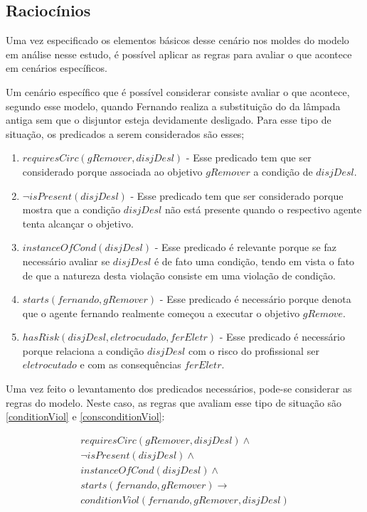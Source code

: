 \subsection{Raciocínios}

Uma vez especificado os elementos básicos desse cenário nos moldes do modelo em análise nesse estudo, é possível aplicar as regras para avaliar o que acontece em cenários específicos. 

Um cenário específico que é possível considerar consiste avaliar o que acontece, segundo esse modelo, quando Fernando realiza a substituição do da lâmpada antiga sem que o disjuntor esteja devidamente desligado. Para esse tipo de situação, os predicados a serem considerados são esses;

\begin{enumerate}
	\item $requiresCirc(gRemover,disjDesl)$ - Esse predicado tem que ser considerado porque associada ao objetivo $gRemover$ a condição de $disjDesl$.
	\item $\neg isPresent(disjDesl)$ - Esse predicado tem que ser considerado porque mostra que a condição $disjDesl$ não está presente quando o respectivo agente tenta alcançar o objetivo.
	\item $instanceOfCond(disjDesl)$ - Esse predicado é relevante porque se faz necessário avaliar se $disjDesl$ é de fato uma condição, tendo em vista o fato de que a natureza desta violação consiste em uma violação de condição.
	\item $starts(fernando,gRemover)$ - Esse predicado é necessário porque denota que o agente fernando realmente começou a executar o objetivo $gRemove$.
	\item $hasRisk(disjDesl, eletrocudado, ferEletr)$ - Esse predicado é necessário porque relaciona a condição $disjDesl$ com o risco do profissional ser $eletrocutado$ e com as consequências $ferEletr$.
\end{enumerate}

Uma vez feito o levantamento dos predicados necessários, pode-se considerar as regras do modelo. Neste caso, as regras que avaliam esse tipo de situação são \ref{conditionViol} e \ref{consconditionViol}:

\begin{eqnarray}\label{applicationCodViolIntrodCase}\nonumber
	requiresCirc(gRemover,disjDesl) \wedge \\ \nonumber   
	\neg isPresent(disjDesl) \wedge  \\ \nonumber   
	instanceOfCond(disjDesl) \wedge \\ \nonumber   
	starts(fernando,gRemover)  \to \\ \nonumber   
	conditionViol(fernando,gRemover,disjDesl) \nonumber \\  
\end{eqnarray}

